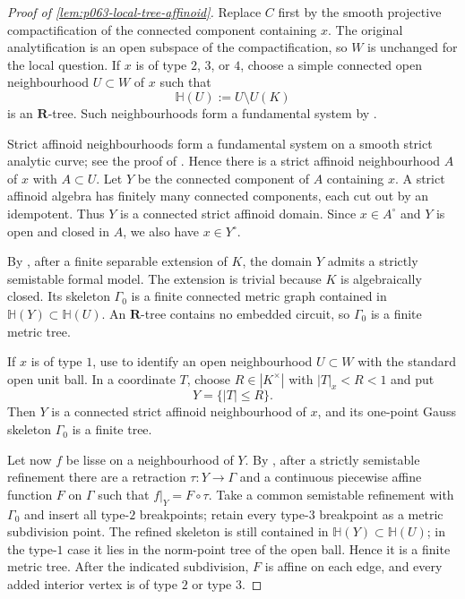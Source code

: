 \begin{proof}[Proof of \cref{lem:p063-local-tree-affinoid}]
Replace \(C\) first by the smooth projective compactification of the
connected component containing \(x\).  The original analytification is an
open subspace of the compactification, so \(W\) is unchanged for the local
question.  If \(x\) is of type \(2\), \(3\), or \(4\), choose a simple
connected open neighbourhood \(U\subset W\) of \(x\) such that
\[
                         \mathbb H(U):=U\setminus U(K)
\]
is an \(\mathbf R\)-tree.  Such neighbourhoods form a fundamental system by
\cite[Corollary~4.27 and Proposition~5.9]{BPR13Structure}.

Strict affinoid neighbourhoods form a fundamental system on a smooth strict
analytic curve; see the proof of \cite[Corollary~2.1.18]{Thu05}.  Hence
there is a strict affinoid neighbourhood \(A\) of \(x\) with \(A\subset U\).
Let \(Y\) be the connected component of \(A\) containing \(x\).  A strict
affinoid algebra has finitely many connected components, each cut out by an
idempotent.  Thus \(Y\) is a connected strict affinoid domain.  Since
\(x\in A^\circ\) and \(Y\) is open and closed in \(A\), we also have
\(x\in Y^\circ\).

By \cite[Theorem~2.3.8]{Thu05}, after a finite separable extension of \(K\),
the domain \(Y\) admits a strictly semistable formal model.  The extension is
trivial because \(K\) is algebraically closed.  Its skeleton \(\Gamma_0\) is
a finite connected metric graph contained in
\(\mathbb H(Y)\subset\mathbb H(U)\).  An \(\mathbf R\)-tree contains no
embedded circuit, so \(\Gamma_0\) is a finite metric tree.

If \(x\) is of type \(1\), use
\cite[Corollary~4.27(1)]{BPR13Structure} to identify an open neighbourhood
\(U\subset W\) with the standard open unit ball.  In a coordinate \(T\),
choose \(R\in|K^\times|\) with \(|T|_x<R<1\) and put
\[
                         Y=\{|T|\leq R\}.
\]
Then \(Y\) is a connected strict affinoid neighbourhood of \(x\), and its
one-point Gauss skeleton \(\Gamma_0\) is a finite tree.

Let now \(f\) be lisse on a neighbourhood of \(Y\).  By
\cite[Proposition~3.2.4]{Thu05}, after a strictly semistable refinement there
are a retraction \(\tau:Y\to\Gamma\) and a continuous piecewise affine
function \(F\) on \(\Gamma\) such that \(f|_Y=F\circ\tau\).  Take a common
semistable refinement with \(\Gamma_0\) and insert all type-\(2\)
breakpoints; retain every type-\(3\) breakpoint as a metric subdivision
point.  The refined skeleton is still contained in
\(\mathbb H(Y)\subset\mathbb H(U)\); in the type-\(1\) case it lies in the
norm-point tree of the open ball.  Hence it is a finite metric tree.  After
the indicated subdivision, \(F\) is affine on each edge, and every added
interior vertex is of type \(2\) or type \(3\).
\end{proof}

